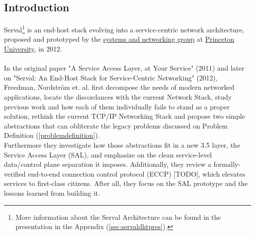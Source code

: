 \subsection{Introduction}
Serval\footnote{More information about the Serval Architecture can be found in the presentation in the Appendix (\ref{sec:servaldhtpres}).} is an end-host stack evolving into a service-centric network architecture, proposed and prototyped by the \href{https://sns.cs.princeton.edu/}{systems and networking group} at \href{https://www.princeton.edu}{Princeton University}, in 2012.

\paragraph{} In the original paper "A Service Access Layer, at Your Service" (2011)\cite{Freedman2011} and later on "Serval: An End-Host Stack for Service-Centric Networking" (2012)\cite{Nordstrom2012}, Freedman, Nordstr{\"o}m et. al. first decompose the needs of modern networked applications, locate the discordances with the current Network Stack, study previous work and how each of them individually fails to stand as a proper solution, rethink the current TCP/IP Networking Stack and propose two simple abstractions that can obliterate the legacy problems discussed on Problem Definition (\ref{problemdefinition}).\\
\indent Furthermore they investigate how those abstractions fit in a new 3.5 layer, the Service Access Layer (SAL), and emphasize on the clean service-level data/control plane separation it imposes.
Additionally, they review a formally-verified end-to-end connection control protocol (ECCP)  [TODO], which elevates services to first-class citizens.
After all, they focus on the SAL prototype and the lessons learned from building it.



